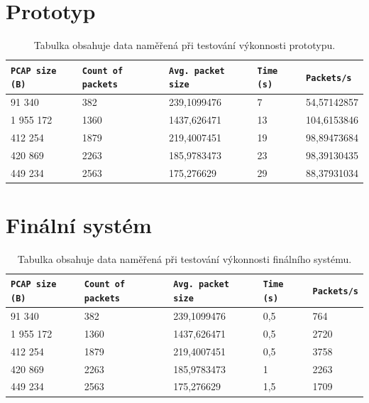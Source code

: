 \section{Prototyp}

\begin{table}[h!]
    \centering
    \begin{tabular}{| l | l | l | l | l |}
    \hline
    \texttt{PCAP size (B)}   &   \texttt{Count of packets}   &   \texttt{Avg. packet size} &  \texttt{Time (s)} &   \texttt{Packets/s} \\ \hline
    91 340 & 382 & 239,1099476 & 7 & 54,57142857 \\ \hline
    1 955 172 & 1360 & 1437,626471 & 13 & 104,6153846 \\ \hline
    412 254 & 1879 & 219,4007451 & 19 & 98,89473684 \\ \hline
    420 869 & 2263 & 185,9783473 & 23 & 98,39130435 \\ \hline
    449 234 & 2563 & 175,276629 & 29 & 88,37931034 \\ \hline
    \end{tabular}\par
    \bigskip
    \caption{Tabulka obsahuje data naměřená při testování výkonnosti prototypu.}
    \label{tablePerformancePrototype}
\end{table}

\section{Finální systém}

\begin{table}[h!]
    \centering
    \begin{tabular}{| l | l | l | l | l |}
    \hline
    \texttt{PCAP size (B)}   &   \texttt{Count of packets}   &   \texttt{Avg. packet size} &  \texttt{Time (s)} &   \texttt{Packets/s} \\ \hline
    91 340 & 382 & 239,1099476 & 0,5 & 764 \\ \hline
    1 955 172 & 1360 & 1437,626471 & 0,5 & 2720 \\ \hline
    412 254 & 1879 & 219,4007451 & 0,5 & 3758 \\ \hline
    420 869 & 2263 & 185,9783473 & 1 & 2263 \\ \hline
    449 234 & 2563 & 175,276629 & 1,5 & 1709 \\ \hline
    \end{tabular}\par
    \bigskip
    \caption{Tabulka obsahuje data naměřená při testování výkonnosti finálního systému.}
    \label{tablePerformanceFinalSystem}
\end{table}

